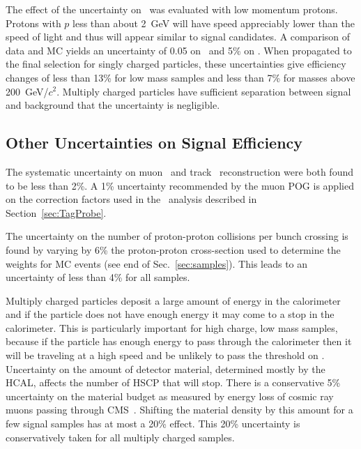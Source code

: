 The effect of the uncertainty on \dedx\ was evaluated with low momentum protons. Protons with $p$ less than  about 2~GeV will have speed appreciably lower than the
speed of light and thus will appear similar to signal candidates. A comparison of data and MC yields an uncertainty of 0.05 on \ias\ and 5\% on \ih. %
When propagated to the final selection for singly charged particles, these uncertainties give efficiency changes of less than 13\% for low mass samples
and less than 7\% for masses above 200~GeV/$c^2$. Multiply charged particles have sufficient
separation between signal and background that the uncertainty is negligible.


\subsection{Other Uncertainties on Signal Efficiency}

The systematic uncertainty on muon~\cite{2012JInst...7P0002T} and track~\cite{CMS-PAS-TRK-10-002} reconstruction were both found to be less than 2\%.
A 1\% uncertainty recommended by the muon POG is applied on the correction factors used in the \muononly\ analysis described in Section~\ref{sec:TagProbe}.

The uncertainty on the number of proton-proton collisions per bunch crossing is found by varying by 6\% the 
proton-proton cross-section used to determine the weights for MC events (see end of Sec.~\ref{sec:samples}).
This leads to an uncertainty of less than 4\% for all samples.

Multiply charged particles deposit a large amount of energy in the calorimeter and if the particle does not have enough energy it may come to a stop in the calorimeter.
This is particularly important for high charge, low mass samples, because if the particle has enough energy to pass through the calorimeter then it will
be traveling at a high speed and be unlikely to pass the threshold on \invbeta. Uncertainty on the amount of detector material, determined mostly by the
HCAL, affects the number of HSCP that will stop. There is a conservative 5\% uncertainty on the material budget as measured by energy loss of cosmic ray muons
passing through CMS~\cite{2010JInst...5T3021C}. Shifting the material density by this amount for a few signal samples has at most a 20\% effect. This 20\% uncertainty is
conservatively taken for all multiply charged samples.

